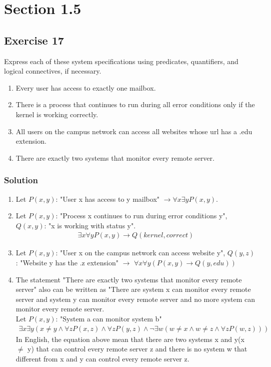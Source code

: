 \documentclass{article}
\begin{document}
\section*{Section 1.5}
\subsection*{Exercise 17}
Express each of these system specifications using predicates, quantifiers, and logical connectives, if necessary.
\begin{enumerate} [label = (\alph*)]
    \item Every user has access to exactly one mailbox.
    \item There is a process that continues to run during all error conditions only if the kernel is working correctly.
    \item All users on the campus network can access all websites whose url has a .edu extension.
    \item There are exactly two systems that monitor every remote server.
\end{enumerate}
\subsubsection*{Solution}
\begin{enumerate} [label = (\alph*)]
    \item Let $P(x, y)$: "User x has access to y mailbox" $\rightarrow \forall x \exists yP(x, y)$.
    \item Let $P(x, y)$: "Process x continues to run during error conditions y", $Q(x, y)$: "x is working with status y".
          \begin{align}
              \exists x \forall yP(x,y) \rightarrow Q(kernel, correct) \nonumber
          \end{align}
    \item Let $P(x,y)$: "User x on the campus network can access website y", $Q(y, z)$: "Website y has the .z extension" $\rightarrow$ $\forall x\forall y(P(x, y) \rightarrow Q(y, edu))$
    \item The statement "There are exactly two systems that monitor every remote server" also can be written as "There are system x can monitor every remote server and system y can monitor every remote server and no more system can monitor every remote server.\\
          Let $P(x,y)$: "System a can monitor system b"
          \begin{align}
              \exists x\exists y(x \ne y \land \forall zP(x, z) \land \forall zP(y, z) \land \lnot \exists w(w \ne x \land w \ne z \land \forall zP(w, z))) \nonumber
          \end{align}
          In English, the equation above mean that there are two systems x and y(x $\ne$ y) that can control every remote server z and there is no system w that different from x and y can control every remote server z.
\end{enumerate}
\end{document}
